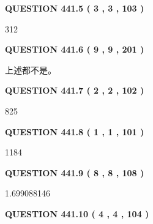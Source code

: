 \documentclass{ctexart}
\begin{document}
\vspace{0.2in}
  
{\textbf{\Large{QUESTION
441.5 
 ( 3 , 3 , 103 )
}}}
  
  
 
 
\noindent{}

312
 
 
  
\vspace{0.2in}
  
{\textbf{\Large{QUESTION
441.6 
 ( 9 , 9 , 201 )
}}}
  
  
 
 
\noindent{}
 
 
 上述都不是。
 
 
 
 
  
\vspace{0.2in}
  
{\textbf{\Large{QUESTION
441.7 
 ( 2 , 2 , 102 )
}}}
  
  
 
 
\noindent{}

825
 
 
  
\vspace{0.2in}
  
{\textbf{\Large{QUESTION
441.8 
 ( 1 , 1 , 101 )
}}}
  
  
 
 
\noindent{}

1184
 
 
  
\vspace{0.2in}
  
{\textbf{\Large{QUESTION
441.9 
 ( 8 , 8 , 108 )
}}}
  
  
 
 
\noindent{}

1.699088146
 
 
  
\vspace{0.2in}
  
{\textbf{\Large{QUESTION
441.10 
 ( 4 , 4 , 104 )
}}}
  
\end{document}
